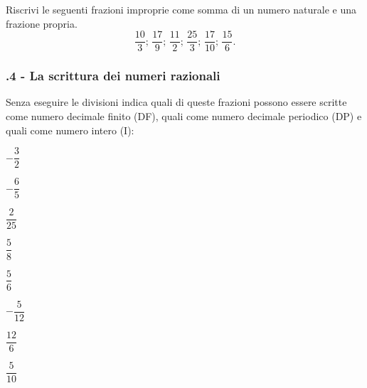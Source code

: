 \begin{esercizio}
 \label{ese:3.22}
 Riscrivi le seguenti frazioni improprie come somma di un numero naturale e una frazione propria.
\[\frac{10}{3};\,\frac{17}{9};\,\frac{11}{2};\,\frac{25}{3};\,\frac{17}{10};\,\frac{15}{6}.\]
\end{esercizio}

\subsubsection*{\thechapter.4 - La scrittura dei numeri razionali}

\begin{esercizio}
 \label{ese:3.23}
 Senza eseguire le divisioni indica quali di queste frazioni possono essere scritte come numero decimale
finito (DF), quali come numero decimale periodico (DP)
e quali come numero intero (I):
 \begin{multicols}{2}
 \TabPositions{1cm}
 \begin{enumeratea}
 \item $-\dfrac{3}{2}$ \tab\qquad\boxDF\qquad\boxDP\quad\:\:\boxI\vspace{1.1ex}
 \item $-\dfrac{6}{5}$ \tab\qquad\boxDF\qquad\boxDP\quad\:\:\boxI\vspace{1.1ex}
 \item $\dfrac{2}{25}$ \tab\qquad\boxDF\qquad\boxDP\quad\:\:\boxI\vspace{1.1ex}
 \item $\dfrac{5}{8}$ \tab\qquad\boxDF\qquad\boxDP\quad\:\:\boxI
 \item $\dfrac{5}{6}$ \tab\qquad\boxDF\qquad\boxDP\quad\:\:\boxI\vspace{1.1ex}
 \item $-\dfrac{5}{12}$ \tab\qquad\boxDF\qquad\boxDP\quad\:\:\boxI\vspace{1.1ex}
 \item $\dfrac{12}{6}$ \tab\qquad\boxDF\qquad\boxDP\quad\:\:\boxI\vspace{1.1ex}
 \item $\dfrac{5}{10}$ \tab\qquad\boxDF\qquad\boxDP\quad\:\:\boxI
 \end{enumeratea}
 \end{multicols}
\end{esercizio}

